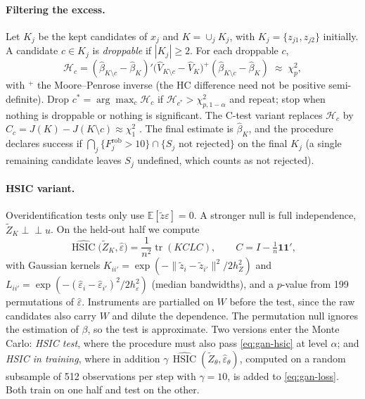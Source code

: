 \documentclass[11pt]{article}
\theoremstyle{definition}
\theoremstyle{remark}
\newcommand{\E}{\mathbb{E}}
\newcommand{\HSIC}{\operatorname{HSIC}}
\newcommand{\indep}{\perp\!\!\!\perp}
\begin{document}
\paragraph{Filtering the excess.} Let $K_j$ be the kept candidates of $x_j$ and $K=\cup_j K_j$, with
$K_j=\{z_{j1},z_{j2}\}$ initially. A candidate $c\in K_j$ is \emph{droppable} if $|K_j|\ge2$. For
each droppable $c$,
\begin{equation}\label{eq:gan-hausman}
  \mathcal{H}_c = (\hat\beta_{K\setminus c}-\hat\beta_K)'
     \big(\hat V_{K\setminus c}-\hat V_K\big)^{+}
     (\hat\beta_{K\setminus c}-\hat\beta_K) \;\approx\; \chi^2_p ,
\end{equation}
with ${}^{+}$ the Moore--Penrose inverse (the HC difference need not be positive semi-definite).
Drop $c^\ast = \arg\max_c\mathcal{H}_c$ if $\mathcal{H}_{c^\ast} > \chi^2_{p,1-\alpha}$ and repeat;
stop when nothing is droppable or nothing is significant. The C-test variant replaces
$\mathcal{H}_c$ by $C_c = J(K) - J(K\setminus c)\approx\chi^2_1$ \citep{eichenbaum1988}. The final
estimate is $\hat\beta_K$, and the procedure declares success if
$\bigcap_j\{F_j^{\mathrm{rob}}>10\}\cap\{S_j\text{ not rejected}\}$ on the final $K_j$ (a single
remaining candidate leaves $S_j$ undefined, which counts as not rejected).

\paragraph{HSIC variant.} Overidentification tests only use $\E[\tilde z\varepsilon]=0$. A stronger
null is full independence, $\tilde Z_K\indep u$. On the held-out half we compute
\begin{equation}\label{eq:gan-hsic}
  \widehat{\HSIC}\big(\tilde Z_K,\hat\varepsilon\big) = \frac{1}{n^2}\operatorname{tr}(KCLC),
  \qquad C = I - \tfrac1n\mathbf{1}\mathbf{1}',
\end{equation}
with Gaussian kernels $K_{ii'}=\exp(-\|\tilde z_i-\tilde z_{i'}\|^2/2h_Z^2)$ and
$L_{ii'}=\exp(-(\hat\varepsilon_i-\hat\varepsilon_{i'})^2/2h_\varepsilon^2)$ (median bandwidths),
and a $p$-value from 199 permutations of $\hat\varepsilon$. Instruments are partialled on $W$ before
the test, since the raw candidates also carry $W$ and dilute the dependence. The permutation null
ignores the estimation of $\beta$, so the test is approximate. Two versions enter the Monte Carlo:
\emph{HSIC test}, where the procedure must also pass \eqref{eq:gan-hsic} at level $\alpha$; and
\emph{HSIC in training}, where in addition $\gamma\,\widehat{\HSIC}(\tilde Z_\theta,
\hat\varepsilon_\theta)$, computed on a random subsample of 512 observations per step with
$\gamma=10$, is added to \eqref{eq:gan-loss}. Both train on one half and test on the other.
\end{document}
